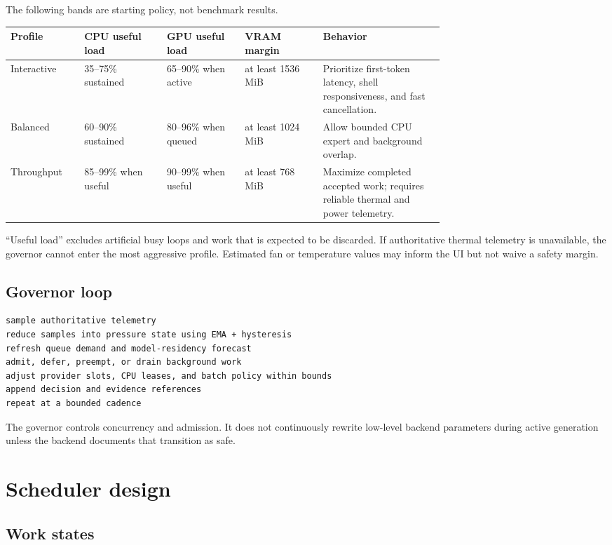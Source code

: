 \documentclass[11pt,letterpaper]{article}
\begin{document}
The following bands are starting policy, not benchmark results.

\begin{tabularx}{\linewidth}{@{}L{0.17\linewidth}L{0.19\linewidth}L{0.18\linewidth}L{0.18\linewidth}Y@{}}
\toprule
\textbf{Profile} & \textbf{CPU useful load} & \textbf{GPU useful load} &
\textbf{VRAM margin} & \textbf{Behavior} \\
\midrule
Interactive &
35--75\% sustained &
65--90\% when active &
at least 1536 MiB &
Prioritize first-token latency, shell responsiveness, and fast cancellation. \\
Balanced &
60--90\% sustained &
80--96\% when queued &
at least 1024 MiB &
Allow bounded CPU expert and background overlap. \\
Throughput &
85--99\% when useful &
90--99\% when useful &
at least 768 MiB &
Maximize completed accepted work; requires reliable thermal and power
telemetry. \\
\bottomrule
\end{tabularx}

``Useful load'' excludes artificial busy loops and work that is expected to be
discarded. If authoritative thermal telemetry is unavailable, the governor
cannot enter the most aggressive profile. Estimated fan or temperature values
may inform the UI but not waive a safety margin.

\subsection{Governor loop}

\begin{lstlisting}
sample authoritative telemetry
reduce samples into pressure state using EMA + hysteresis
refresh queue demand and model-residency forecast
admit, defer, preempt, or drain background work
adjust provider slots, CPU leases, and batch policy within bounds
append decision and evidence references
repeat at a bounded cadence
\end{lstlisting}

The governor controls concurrency and admission. It does not continuously
rewrite low-level backend parameters during active generation unless the
backend documents that transition as safe.

\section{Scheduler design}

\subsection{Work states}
\end{document}

